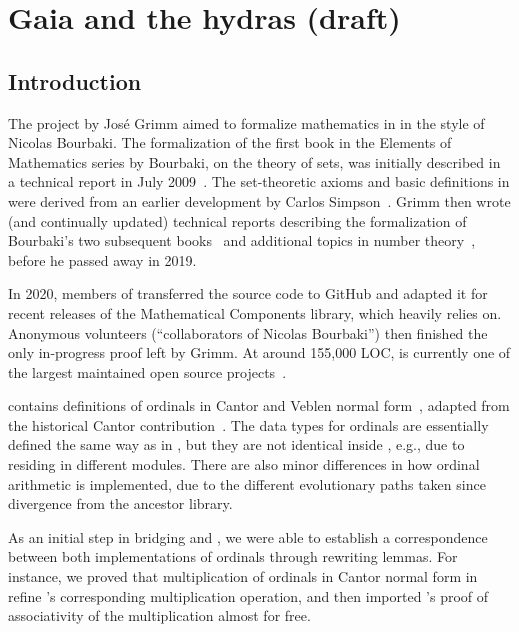 \chapter{Gaia and the hydras (draft)}

\section{Introduction}
The \gaia project by Jos\'e Grimm aimed to formalize mathematics in \coq in the style of Nicolas Bourbaki. The formalization of the first book in the Elements of Mathematics series by Bourbaki, on the theory of sets, was initially described in a technical report in July 2009~\cite{Grimm2009a}. The set-theoretic axioms and basic definitions in \gaia were derived from an earlier development by Carlos Simpson~\cite{Simpson2004,CatsZFCContrib}. Grimm then wrote (and continually updated) technical reports describing the formalization of Bourbaki's two subsequent books~\cite{Grimm2009b,Grimm2016} and additional topics in number theory~\cite{grimm:hal-00911710,Grimm2014}, before he passed away in 2019.

In 2020, members of \community transferred the \gaia source code to GitHub and adapted it for recent releases of the Mathematical Components library, which \gaia heavily relies on. Anonymous volunteers (``collaborators of Nicolas Bourbaki'') then finished the only in-progress proof left by Grimm. At around 155,000 LOC, \gaia is currently one of the largest maintained open source \coq projects~\cite{Gaia}.

\gaia contains definitions of ordinals in Cantor and Veblen normal form~\cite{grimm:hal-00911710}, adapted from the historical Cantor contribution~\cite{CantorContrib}. The data types for ordinals are essentially defined the same way as in \Hydras, but they are not identical inside \coq, e.g., due to residing in different modules. There are also minor differences in how ordinal arithmetic is implemented, due to the different evolutionary paths taken since divergence from the ancestor library.

As an initial step in bridging \gaia and \Hydras, we were able to establish a correspondence between both implementations of ordinals through rewriting lemmas. For instance, we proved that multiplication of ordinals in Cantor normal form in \Hydras refine \gaia's corresponding multiplication operation, and then imported \gaia's proof of associativity of the multiplication almost for free.


